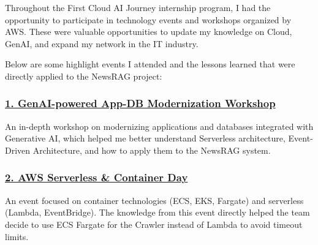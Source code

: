 Throughout the First Cloud AI Journey internship program, I had the
opportunity to participate in technology events and workshops organized
by AWS. These were valuable opportunities to update my knowledge on
Cloud, GenAI, and expand my network in the IT industry.

Below are some highlight events I attended and the lessons learned that
were directly applied to the NewsRAG project:

\hypertarget{genai-powered-app-db-modernization-workshop}{%
\subsubsection{\texorpdfstring{\href{4.1-Event1/}{1. GenAI-powered
App-DB Modernization
Workshop}}{1. GenAI-powered App-DB Modernization Workshop}}}

An in-depth workshop on modernizing applications and databases
integrated with Generative AI, which helped me better understand
Serverless architecture, Event-Driven Architecture, and how to apply
them to the NewsRAG system.

\hypertarget{aws-serverless-container-day}{%
\subsubsection{\texorpdfstring{\href{4.2-Event2/}{2. AWS Serverless \&
Container
Day}}{2. AWS Serverless \& Container Day}}}

An event focused on container technologies (ECS, EKS, Fargate) and
serverless (Lambda, EventBridge). The knowledge from this event directly
helped the team decide to use ECS Fargate for the Crawler instead of
Lambda to avoid timeout limits.

